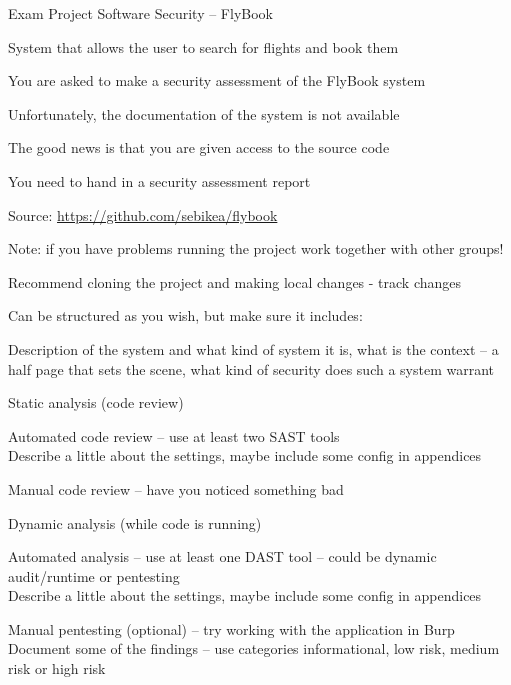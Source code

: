 \documentclass[Screen16to9,17pt]{foils}
\begin{document}
\mytitlepage
{Exam Project}
{Software Security -- FlyBook}


\begin{list2}
\item System that allows the user to search for flights and book them
\end{list2}



\begin{list2}
\item You are asked to make a security assessment of the FlyBook system
\item Unfortunately, the documentation of the system is not available
\item The good news is that you are given access to the source code
\item You need to hand in a security assessment report
\end{list2}

\vskip 1cm
Source: \url{https://github.com/sebikea/flybook}

Note: if you have problems running the project work together with other groups!

Recommend cloning the project and making local changes - track changes




Can be structured as you wish, but make sure it includes:
\begin{list1}
\item Description of the system and what kind of system it is, what is the context -- a half page that sets the scene, what kind of security does such a system warrant
\item Static analysis (code review)
  \begin{list2}
  \item Automated code review -- use at least two SAST tools\\
  Describe a little about the settings, maybe include some config in appendices
  \item Manual code review -- have you noticed something bad
  \end{list2}
\item Dynamic analysis (while code is running)
  \begin{list2}
  \item Automated analysis -- use at least one DAST tool -- could be dynamic audit/runtime or pentesting\\
  Describe a little about the settings, maybe include some config in appendices
  \item Manual pentesting (optional) -- try working with the application in Burp\\
  Document some of the findings -- use categories informational, low risk, medium risk or high risk
  \end{list2}
\end{list1}
\end{document}
